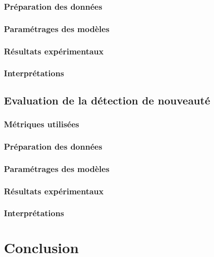 	\subsubsection{Préparation des données}
	\subsubsection{Paramétrages des modèles}
	\subsubsection{Résultats expérimentaux}
	\subsubsection{Interprétations}
	\subsection{Evaluation de la détection de nouveauté}
	\subsubsection{Métriques utilisées}
	\subsubsection{Préparation des données}
	\subsubsection{Paramétrages des modèles}
	\subsubsection{Résultats expérimentaux}
	\subsubsection{Interprétations}
	\section{Conclusion}
		

